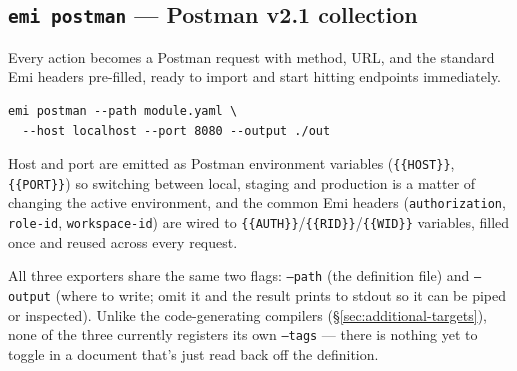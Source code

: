 \subsection{\texttt{emi postman} --- Postman v2.1 collection}
Every action becomes a Postman request with method, URL, and the standard
Emi headers pre-filled, ready to import and start hitting endpoints
immediately.
\begin{lstlisting}
emi postman --path module.yaml \
  --host localhost --port 8080 --output ./out
\end{lstlisting}
Host and port are emitted as Postman environment variables
(\texttt{\{\{HOST\}\}}, \texttt{\{\{PORT\}\}}) so switching between
local, staging and production is a matter of changing the active
environment, and the common Emi headers (\texttt{authorization},
\texttt{role-id}, \texttt{workspace-id}) are wired to
\texttt{\{\{AUTH\}\}}/\texttt{\{\{RID\}\}}/\texttt{\{\{WID\}\}}
variables, filled once and reused across every request.

\begin{pullquote}
All three exporters share the same two flags: \texttt{--path} (the
definition file) and \texttt{--output} (where to write; omit it and the
result prints to stdout so it can be piped or inspected). Unlike the
code-generating compilers (\S\ref{sec:additional-targets}), none of the
three currently registers its own \texttt{--tags} --- there is nothing
yet to toggle in a document that's just read back off the definition.
\end{pullquote}
